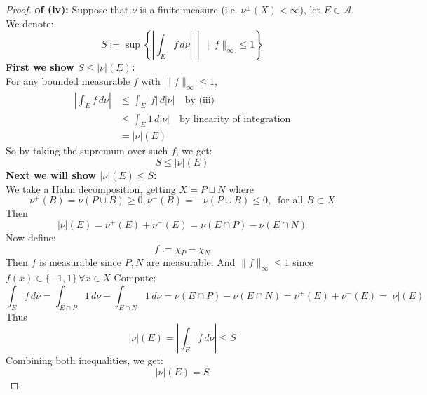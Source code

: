 \documentclass[lang=cn,11pt]{elegantbook}
\begin{document}
\begin{proof}
    \textbf{of (iv):}
Suppose that $\nu$ is a finite measure (i.e. $\nu^{\pm}(X)<\infty$), let $E\in \mathcal{A}$.\\
We denote: \[
S := \sup \left\{ \left| \int_E f \, d\nu \right| \,\middle|\, \|f\|_\infty \le 1 \right\}
\]
\textbf{First we show \( S \le |\nu|(E) \):}\\
For any bounded measurable \(f\) with \(\|f\|_\infty \le 1\), \begin{align*}
    \left| \int_E f \, d\nu \right| &\le \int_E |f| \, d|\nu| \quad\text{by (iii)}\\
    &\leq \int_{E} 1 \, d|\nu| \quad\text{by linearity of integration}\\
    & = |\nu| (E)
\end{align*}
So by taking the supremum over such \(f\), we get:
\[
S \le |\nu|(E)
\]
\textbf{Next we will show \( |\nu|(E) \le S \):}\\
We take a Hahn decomposition, getting $X  = P \sqcup N$ where \[
\nu^+ (B) = \nu(P \cup B) \geq 0,\nu^-(B) = -\nu(P \cup B) \leq 0, \;\;\text{for all } B \subset X
\]
Then
\[
|\nu|(E) = \nu^+(E) + \nu^-(E) = \nu(E\cap P) - \nu(E \cap N)
\]
Now define:
\[
f := \chi_P - \chi_{N}
\]
Then \(f\) is measurable since $P,N$ are measurable. And \(\|f\|_\infty \le 1\) since $f(x)\in \{ -1,1\}\,\forall x\in X$
Compute:
\[
\int_E f \, d\nu = \int_{E \cap P} 1 \, d\nu - \int_{E\cap N} 1 \, d\nu
= \nu(E \cap P) - \nu(E \cap N ) = \nu^+(E) + \nu^-(E) =  |\nu|(E)
\]
Thus \[
|\nu|(E) = \left| \int_E f \, d\nu \right| \le S
\]
Combining both inequalities, we get: \[
|\nu|(E) = S
\]
\end{proof}
\end{document}
